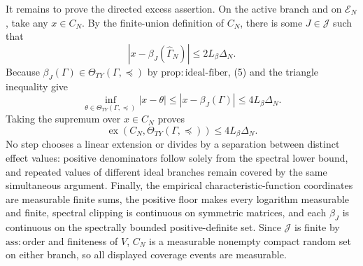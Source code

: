 It remains to prove the directed excess assertion.  On the active branch and on \(\mathcal E_N\), take any \(x\in C_N\).  By the finite-union definition of \(C_N\), there is some \(J\in\mathcal J\) such that
\[
 |x-\beta_J(\widehat\Gamma_N)|\le2L_\beta\Delta_N.
\]
Because \(\beta_J(\Gamma)\in\Theta_{TY}(\Gamma,\preceq)\) by \(\mathrm{prop:ideal\text{-}fiber}\), (5) and the triangle inequality give
\[
 \inf_{\theta\in\Theta_{TY}(\Gamma,\preceq)}|x-\theta|
 \le |x-\beta_J(\Gamma)|
 \le4L_\beta\Delta_N.
\]
Taking the supremum over \(x\in C_N\) proves
\[
 \operatorname{ex}\!\left(C_N,\Theta_{TY}(\Gamma,\preceq)\right)
 \le4L_\beta\Delta_N.
\]
No step chooses a linear extension or divides by a separation between distinct effect values: positive denominators follow solely from the spectral lower bound, and repeated values of different ideal branches remain covered by the same simultaneous argument.  Finally, the empirical characteristic-function coordinates are measurable finite sums, the positive floor makes every logarithm measurable and finite, spectral clipping is continuous on symmetric matrices, and each \(\beta_J\) is continuous on the spectrally bounded positive-definite set.  Since \(\mathcal J\) is finite by \(\mathrm{ass:order}\) and finiteness of \(V\), \(C_N\) is a measurable nonempty compact random set on either branch, so all displayed coverage events are measurable.
